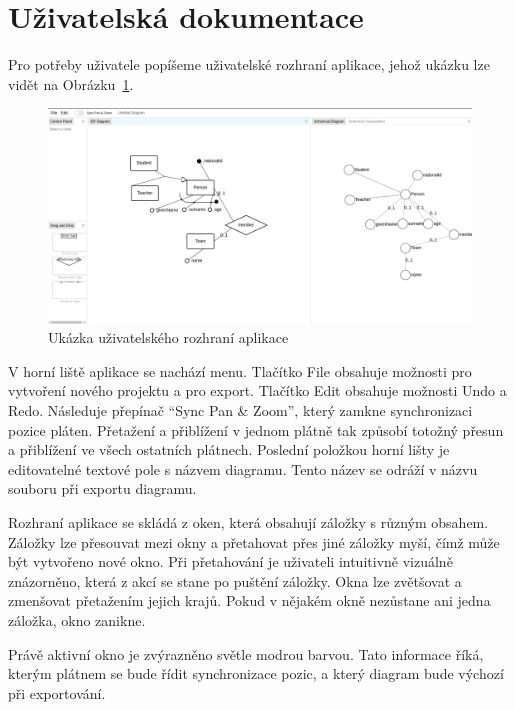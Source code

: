 \section{Uživatelská dokumentace}
Pro potřeby uživatele popíšeme uživatelské rozhraní aplikace, jehož ukázku lze vidět na Obrázku~\ref{fig:user-interface}.

\begin{figure}[!htb]
 \centering 
 \includegraphics[width=\maxwidth{\textwidth}]{../img/app/user-interface.png}
 \caption{Ukázka uživatelského rozhraní aplikace}
 \label{fig:user-interface}
\end{figure}

V horní liště aplikace se nachází menu.
Tlačítko File obsahuje možnosti pro vytvoření nového projektu a pro export.
Tlačítko Edit obsahuje možnosti Undo a Redo.
Následuje přepínač \enquote{Sync Pan \& Zoom}, který zamkne synchronizaci pozice pláten.
Přetažení a přiblížení v jednom plátně tak způsobí totožný přesun a přiblížení ve všech ostatních plátnech.
Poslední položkou horní lišty je editovatelné textové pole s názvem diagramu.
Tento název se odráží v názvu souboru při exportu diagramu.

Rozhraní aplikace se skládá z oken, která obsahují záložky s různým obsahem.
Záložky lze přesouvat mezi okny a přetahovat přes jiné záložky myší, čímž může být vytvořeno nové okno.
Při přetahování je uživateli intuitivně vizuálně znázorněno, která z akcí se stane po puštění záložky.
Okna lze zvětšovat a zmenšovat přetažením jejich krajů.
Pokud v nějakém okně nezůstane ani jedna záložka, okno zanikne.

Právě aktivní okno je zvýrazněno světle modrou barvou.
Tato informace říká, kterým plátnem se bude řídit synchronizace pozic, a který diagram bude výchozí při exportování.

